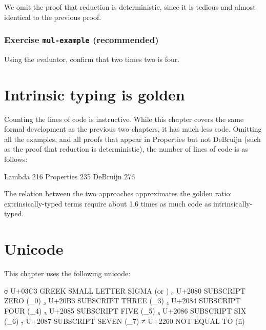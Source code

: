 We omit the proof that reduction is deterministic, since it is tedious
and almost identical to the previous proof.

\hypertarget{exercise-mul-example-recommended}{%
\subsubsection{\texorpdfstring{Exercise \texttt{mul-example}
(recommended)}{Exercise mul-example (recommended)}}\label{exercise-mul-example-recommended}}

Using the evaluator, confirm that two times two is four.

\begin{fence}
\begin{code}%
\>[0]\<%
\end{code}
\end{fence}

\hypertarget{intrinsic-typing-is-golden}{%
\section{Intrinsic typing is golden}\label{intrinsic-typing-is-golden}}

Counting the lines of code is instructive. While this chapter covers the
same formal development as the previous two chapters, it has much less
code. Omitting all the examples, and all proofs that appear in
Properties but not DeBruijn (such as the proof that reduction is
deterministic), the number of lines of code is as follows:

\begin{myDisplay}
Lambda                      216
Properties                  235
DeBruijn                    276
\end{myDisplay}

The relation between the two approaches approximates the golden ratio:
extrinsically-typed terms require about 1.6 times as much code as
intrinsically-typed.

\hypertarget{unicode}{%
\section{Unicode}\label{unicode}}

This chapter uses the following unicode:

\begin{myDisplay}
σ  U+03C3  GREEK SMALL LETTER SIGMA (\Gs or \sigma)
₀  U+2080  SUBSCRIPT ZERO (\_0)
₃  U+20B3  SUBSCRIPT THREE (\_3)
₄  U+2084  SUBSCRIPT FOUR (\_4)
₅  U+2085  SUBSCRIPT FIVE (\_5)
₆  U+2086  SUBSCRIPT SIX (\_6)
₇  U+2087  SUBSCRIPT SEVEN (\_7)
≠  U+2260  NOT EQUAL TO (\=n)
\end{myDisplay}


